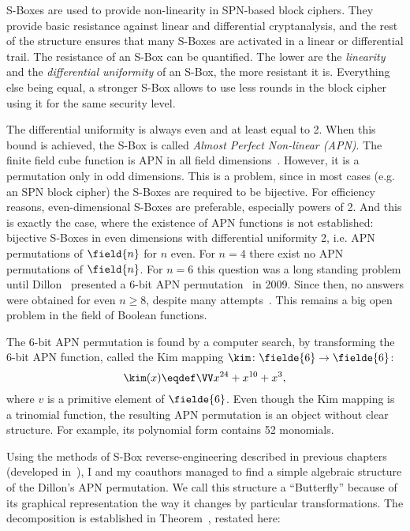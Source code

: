 
S-Boxes are used to provide non-linearity in SPN-based block ciphers. They provide basic resistance against linear and differential cryptanalysis, and the rest of the structure ensures that many S-Boxes are activated in a linear or differential trail. The resistance of an S-Box can be quantified. The lower are the \emph{linearity} and the \emph{differential uniformity} of an S-Box, the more resistant it is. Everything else being equal, a stronger S-Box allows to use less rounds in the block cipher using it for the same security level.

The differential uniformity is always even and at least equal to 2. When this bound is achieved, the S-Box is called \emph{Almost Perfect Non-linear (APN)}. The finite field cube function is APN in all field dimensions~\cite{Nyb94}. However, it is a permutation only in odd dimensions. This is a problem, since in most cases (e.g. an SPN block cipher) the S-Boxes are required to be bijective. For efficiency reasons, even-dimensional S-Boxes are preferable, especially powers of 2. And this is exactly the case, where the existence of APN functions is not established: bijective S-Boxes in even dimensions with differential uniformity 2, i.e. APN permutations of $\field{n}$ for $n$ even. For $n = 4$ there exist no APN permutations of $\field{n}$. For $n = 6$ this question was a long standing problem until Dillon~\etal{} presented a 6-bit APN permutation~\cite{DillonAPN,DillonPres} in 2009. Since then, no answers were obtained for even $n \ge 8$, despite many attempts~\cite{SubspaceProperty,Uniform4}. This remains a big open problem in the field of Boolean functions.

The 6-bit APN permutation is found by a computer search, by transforming the 6-bit APN function, called the Kim mapping $\kim\colon \fielde{6} \to \fielde{6}$:
$$
\kim(x) \eqdef \VV x^{24} + x^{10} + x^3,
$$
where $v$ is a primitive element of $\fielde{6}$. Even though the Kim mapping is a trinomial function, the resulting APN permutation is an object without clear structure. For example, its polynomial form contains 52 monomials.

Using the methods of S-Box reverse-engineering described in previous chapters (developed in~\cite{OurKuz1}), I and my coauthors managed to find a simple algebraic structure of the Dillon's APN permutation. We call this structure a ``Butterfly'' because of its graphical representation the way it changes by particular transformations. The decomposition is established in Theorem~, restated here:

